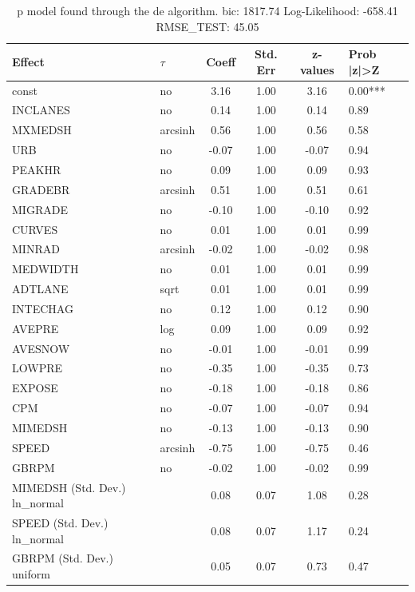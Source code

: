\begin{table}
	\caption{p model found through the de algorithm. bic: 1817.74 Log-Likelihood: -658.41 RMSE_TEST: 45.05}
	\begin{center}
		\begin{tabular}{|l|l|c|c|c|l|}
			\hline
			Effect & $\tau$ & Coeff & Std. Err & z-values & Prob |z|>Z \\
			\hline
			const & no & 3.16 & 1.00 & 3.16 & 0.00*** \\
			\hline
			INCLANES & no & 0.14 & 1.00 & 0.14 & 0.89 \\
			\hline
			MXMEDSH & arcsinh & 0.56 & 1.00 & 0.56 & 0.58 \\
			\hline
			URB & no & -0.07 & 1.00 & -0.07 & 0.94 \\
			\hline
			PEAKHR & no & 0.09 & 1.00 & 0.09 & 0.93 \\
			\hline
			GRADEBR & arcsinh & 0.51 & 1.00 & 0.51 & 0.61 \\
			\hline
			MIGRADE & no & -0.10 & 1.00 & -0.10 & 0.92 \\
			\hline
			CURVES & no & 0.01 & 1.00 & 0.01 & 0.99 \\
			\hline
			MINRAD & arcsinh & -0.02 & 1.00 & -0.02 & 0.98 \\
			\hline
			MEDWIDTH & no & 0.01 & 1.00 & 0.01 & 0.99 \\
			\hline
			ADTLANE & sqrt & 0.01 & 1.00 & 0.01 & 0.99 \\
			\hline
			INTECHAG & no & 0.12 & 1.00 & 0.12 & 0.90 \\
			\hline
			AVEPRE & log & 0.09 & 1.00 & 0.09 & 0.92 \\
			\hline
			AVESNOW & no & -0.01 & 1.00 & -0.01 & 0.99 \\
			\hline
			LOWPRE & no & -0.35 & 1.00 & -0.35 & 0.73 \\
			\hline
			EXPOSE & no & -0.18 & 1.00 & -0.18 & 0.86 \\
			\hline
			CPM & no & -0.07 & 1.00 & -0.07 & 0.94 \\
			\hline
			MIMEDSH & no & -0.13 & 1.00 & -0.13 & 0.90 \\
			\hline
			SPEED & arcsinh & -0.75 & 1.00 & -0.75 & 0.46 \\
			\hline
			GBRPM & no & -0.02 & 1.00 & -0.02 & 0.99 \\
			\hline
			MIMEDSH (Std. Dev.) ln_normal &  & 0.08 & 0.07 & 1.08 & 0.28 \\
			\hline
			SPEED (Std. Dev.) ln_normal &  & 0.08 & 0.07 & 1.17 & 0.24 \\
			\hline
			GBRPM (Std. Dev.) uniform &  & 0.05 & 0.07 & 0.73 & 0.47 \\
			\hline
		\end{tabular}
	\end{center}
\end{table}